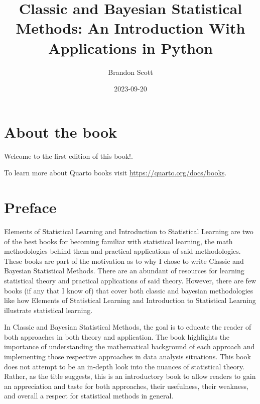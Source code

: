 \documentclass[
  letterpaper,
  DIV=11,
  numbers=noendperiod]{scrreprt}
\title{Classic and Bayesian Statistical Methods: An Introduction With
Applications in Python}
\author{Brandon Scott}
\date{2023-09-20}
\renewcommand*\contentsname{Table of contents}
\newcommand\contentsname{Table of contents}
\begin{document}
\maketitle
\ifdefined\Shaded\renewenvironment{Shaded}{\begin{tcolorbox}[boxrule=0pt, breakable, enhanced, frame hidden, sharp corners, borderline west={3pt}{0pt}{shadecolor}, interior hidden]}{\end{tcolorbox}}\fi

\renewcommand*\contentsname{Table of contents}
{
\hypersetup{linkcolor=}
\setcounter{tocdepth}{2}
\tableofcontents
}

\hypertarget{about-the-book}{%
\chapter*{About the book}\label{about-the-book}}


Welcome to the first edition of this book!.

To learn more about Quarto books visit
\url{https://quarto.org/docs/books}.


\hypertarget{preface}{%
\chapter*{Preface}\label{preface}}


Elements of Statistical Learning and Introduction to Statistical
Learning are two of the best books for becoming familiar with
statistical learning, the math methodologies behind them and practical
applications of said methodologies. These books are part of the
motivation as to why I chose to write Classic and Bayesian Statistical
Methods. There are an abundant of resources for learning statistical
theory and practical applications of said theory. However, there are few
books (if any that I know of) that cover both classic and bayesian
methodologies like how Elements of Statistical Learning and Introduction
to Statistical Learning illustrate statistical learning.

In Classic and Bayesian Statistical Methods, the goal is to educate the
reader of both approaches in both theory and application. The book
highlights the importance of understanding the mathematical background
of each approach and implementing those respective approaches in data
analysis situations. This book does not attempt to be an in-depth look
into the nuances of statistical theory. Rather, as the title suggests,
this is an introductory book to allow readers to gain an appreciation
and taste for both approaches, their usefulness, their weakness, and
overall a respect for statistical methods in general.
\end{document}
